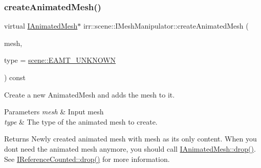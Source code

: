 \subsubsection{\texorpdfstring{create\+Animated\+Mesh()}{createAnimatedMesh()}\hspace{0.1cm}{\footnotesize\ttfamily [1/2]}}
{\footnotesize\ttfamily virtual \hyperlink{classirr_1_1scene_1_1IAnimatedMesh}{I\+Animated\+Mesh}$\ast$ irr\+::scene\+::\+I\+Mesh\+Manipulator\+::create\+Animated\+Mesh (\begin{DoxyParamCaption}\item[{\hyperlink{classirr_1_1scene_1_1IMesh}{I\+Mesh} $\ast$}]{mesh,  }\item[{\hyperlink{namespaceirr_1_1scene_a2fc85a64604521ca063f1881b5dd1c61}{scene\+::\+E\+\_\+\+A\+N\+I\+M\+A\+T\+E\+D\+\_\+\+M\+E\+S\+H\+\_\+\+T\+Y\+PE}}]{type = {\ttfamily \hyperlink{namespaceirr_1_1scene_a2fc85a64604521ca063f1881b5dd1c61a2db2999504900cad42b9295f4198434f}{scene\+::\+E\+A\+M\+T\+\_\+\+U\+N\+K\+N\+O\+WN}} }\end{DoxyParamCaption}) const\hspace{0.3cm}{\ttfamily [pure virtual]}}



Create a new Animated\+Mesh and adds the mesh to it. 


\begin{DoxyParams}{Parameters}
{\em mesh} & Input mesh \\
\hline
{\em type} & The type of the animated mesh to create. \\
\hline
\end{DoxyParams}
\begin{DoxyReturn}{Returns}
Newly created animated mesh with mesh as its only content. When you don\textquotesingle{}t need the animated mesh anymore, you should call \hyperlink{classirr_1_1IReferenceCounted_a03856a09355b89d178090c4a5f738543}{I\+Animated\+Mesh\+::drop()}. See \hyperlink{classirr_1_1IReferenceCounted_a03856a09355b89d178090c4a5f738543}{I\+Reference\+Counted\+::drop()} for more information. 
\end{DoxyReturn}
\mbox{\label{classirr_1_1scene_1_1IMeshManipulator_a08c2483575a88f68d099690932c11562}} 
